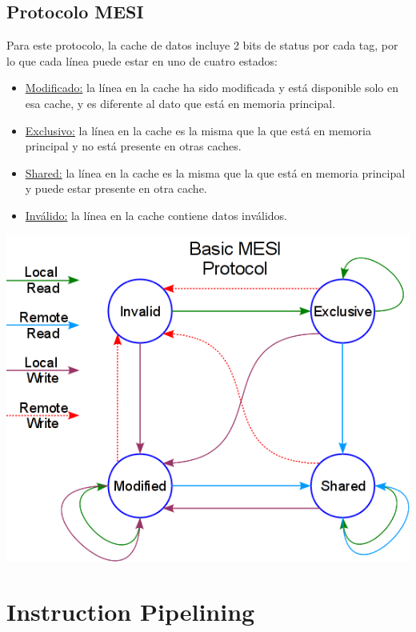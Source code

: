 \subsection{Protocolo MESI}

Para este protocolo, la cache de datos incluye 2 bits de status por cada tag, por lo que cada l\'inea puede estar en uno de cuatro estados:

\begin{itemize}
 \item \underline{Modificado:} la l\'inea en la cache ha sido modificada y est\'a disponible solo en esa cache, y es diferente al dato que est\'a en memoria principal.
 \item \underline{Exclusivo:} la l\'inea en la cache es la misma que la que est\'a en memoria principal y no est\'a presente en otras caches.
 \item \underline{Shared:} la l\'inea en la cache es la misma que la que est\'a en memoria principal y puede estar presente en otra cache.
 \item \underline{Inv\'alido:} la l\'inea en la cache contiene datos inv\'alidos.
\end{itemize}

\begin{center}
\includegraphics[scale=0.6]{./Graficos/MESI.png} 
\end{center}


\section{Instruction Pipelining}

